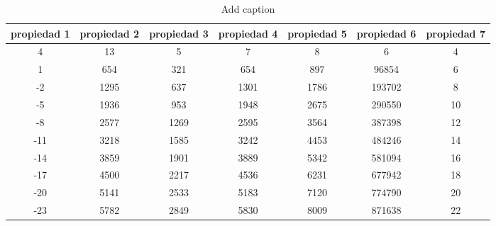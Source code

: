 \documentclass[11pt, a4paper]{article} %
\begin{document}
\begin{table}[htbp]
  \centering
  \caption{Add caption}
    \begin{tabular}{|c|c|c|c|c|c|c|}
    \toprule
    \rowcolor[rgb]{ .776,  .878,  .706} \textbf{propiedad 1} & \textbf{propiedad 2} & \textbf{propiedad 3} & \textbf{propiedad 4} & \textbf{propiedad 5} & \textbf{propiedad 6} & \textbf{propiedad 7} \\
    \hline
    \rowcolor[rgb]{ .988,  .894,  .839} 4     & 13    & 5     & 7     & 8     & 6     & 4 \\
    \hline
    \rowcolor[rgb]{ .988,  .894,  .839} 1     & 654   & 321   & 654   & 897   & 96854 & 6 \\
    \hline
    \rowcolor[rgb]{ .988,  .894,  .839} -2    & 1295  & 637   & 1301  & 1786  & 193702 & 8 \\
    \hline
    \rowcolor[rgb]{ .988,  .894,  .839} -5    & 1936  & 953   & 1948  & 2675  & 290550 & 10 \\
    \hline
    \rowcolor[rgb]{ .988,  .894,  .839} -8    & 2577  & 1269  & 2595  & 3564  & 387398 & 12 \\
    \hline
    \rowcolor[rgb]{ .988,  .894,  .839} -11   & 3218  & 1585  & 3242  & 4453  & 484246 & 14 \\
    \hline
    \rowcolor[rgb]{ .988,  .894,  .839} -14   & 3859  & 1901  & 3889  & 5342  & 581094 & 16 \\
    \hline
    \rowcolor[rgb]{ .988,  .894,  .839} -17   & 4500  & 2217  & 4536  & 6231  & 677942 & 18 \\
    \hline
    \rowcolor[rgb]{ .988,  .894,  .839} -20   & 5141  & 2533  & 5183  & 7120  & 774790 & 20 \\
    \hline
    \rowcolor[rgb]{ .988,  .894,  .839} -23   & 5782  & 2849  & 5830  & 8009  & 871638 & 22 \\
    \hline
    \end{tabular}%
  \label{tab:addlabel}%
\end{table}%
\end{document}
